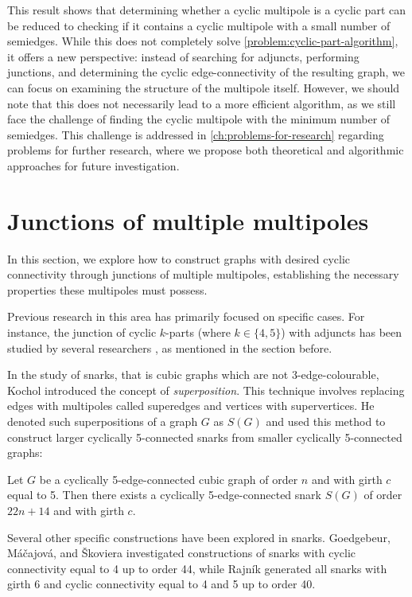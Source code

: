 \documentclass[12pt, twoside]{book}
\begin{document}
This result shows that determining whether a cyclic multipole is a cyclic part can be reduced to checking if it contains a cyclic multipole with a small number of semiedges. While this does not completely solve \cref{problem:cyclic-part-algorithm}, it offers a new perspective: instead of searching for adjuncts, performing junctions, and determining the cyclic edge-connectivity of the resulting graph, we can focus on examining the structure of the multipole itself. However, we should note that this does not necessarily lead to a more efficient algorithm, as we still face the challenge of finding the cyclic multipole with the minimum number of semiedges. This challenge is addressed in \cref{ch:problems-for-research} regarding problems for further research, where we propose both theoretical and algorithmic approaches for future investigation.

\section{Junctions of multiple multipoles}\label{sec:junction-multiple-results}

In this section, we explore how to construct graphs with desired cyclic connectivity through junctions of multiple multipoles, establishing the necessary properties these multipoles must possess.

Previous research in this area has primarily focused on specific cases. For instance, the junction of cyclic $k$-parts (where $k\in\{4,5\}$) with adjuncts has been studied by several researchers \cite{Andersen1988, Rajnik_phd}, as mentioned in the section before.

In the study of snarks, that is cubic graphs which are not 3-edge-colourable, Kochol introduced the concept of \textit{superposition}. This technique involves replacing edges with multipoles called superedges and vertices with supervertices. He denoted such superpositions of a graph $G$ as $S(G)$ and used this method to construct larger cyclically 5-connected snarks from smaller cyclically 5-connected graphs:

\begin{theorem}
	Let $G$ be a cyclically 5-edge-connected cubic graph of order $n$ and with girth $c$ equal to 5. Then there exists a cyclically 5-edge-connected snark $S(G)$ of order $22n+14$ and with girth $c$.
\end{theorem}

Several other specific constructions have been explored in snarks. Goedgebeur, Máčajová, and Škoviera \cite{Goedgebeur2019, Goedgebeur2020} investigated constructions of snarks with cyclic connectivity equal to 4 up to order 44, while Rajník \cite{Rajnik_mgr} generated all snarks with girth 6 and cyclic connectivity equal to 4 and 5 up to order 40.
\end{document}
